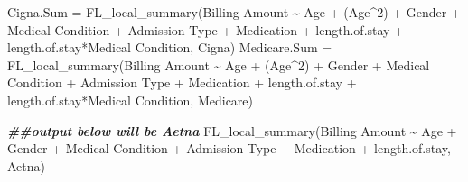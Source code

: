 \documentclass[
]{article}
\newenvironment{Shaded}{\begin{snugshade}}{\end{snugshade}}
\newcommand{\AttributeTok}[1]{\textcolor[rgb]{0.77,0.63,0.00}{#1}}
\newcommand{\DecValTok}[1]{\textcolor[rgb]{0.00,0.00,0.81}{#1}}
\newcommand{\DocumentationTok}[1]{\textcolor[rgb]{0.56,0.35,0.01}{\textbf{\textit{#1}}}}
\newcommand{\FunctionTok}[1]{\textcolor[rgb]{0.00,0.00,0.00}{#1}}
\newcommand{\NormalTok}[1]{#1}
\newcommand{\OtherTok}[1]{\textcolor[rgb]{0.56,0.35,0.01}{#1}}
\newcommand{\SpecialCharTok}[1]{\textcolor[rgb]{0.00,0.00,0.00}{#1}}
\newcommand{\StringTok}[1]{\textcolor[rgb]{0.31,0.60,0.02}{#1}}
\begin{document}
\begin{Shaded}
\begin{Highlighting}[]
\NormalTok{Cigna.Sum }\OtherTok{=} \FunctionTok{FL\_local\_summary}\NormalTok{(}\StringTok{\textasciigrave{}}\AttributeTok{Billing Amount}\StringTok{\textasciigrave{}} \SpecialCharTok{\textasciitilde{}}\NormalTok{ Age }\SpecialCharTok{+}\NormalTok{ (Age}\SpecialCharTok{\^{}}\DecValTok{2}\NormalTok{) }\SpecialCharTok{+}\NormalTok{ Gender }\SpecialCharTok{+} \StringTok{\textasciigrave{}}\AttributeTok{Medical Condition}\StringTok{\textasciigrave{}} \SpecialCharTok{+} \StringTok{\textasciigrave{}}\AttributeTok{Admission Type}\StringTok{\textasciigrave{}} \SpecialCharTok{+}\NormalTok{ Medication }\SpecialCharTok{+}\NormalTok{ length.of.stay }\SpecialCharTok{+}\NormalTok{ length.of.stay}\SpecialCharTok{*}\StringTok{\textasciigrave{}}\AttributeTok{Medical Condition}\StringTok{\textasciigrave{}}\NormalTok{, Cigna)}
\NormalTok{Medicare.Sum }\OtherTok{=} \FunctionTok{FL\_local\_summary}\NormalTok{(}\StringTok{\textasciigrave{}}\AttributeTok{Billing Amount}\StringTok{\textasciigrave{}} \SpecialCharTok{\textasciitilde{}}\NormalTok{ Age }\SpecialCharTok{+}\NormalTok{ (Age}\SpecialCharTok{\^{}}\DecValTok{2}\NormalTok{) }\SpecialCharTok{+}\NormalTok{ Gender }\SpecialCharTok{+} \StringTok{\textasciigrave{}}\AttributeTok{Medical Condition}\StringTok{\textasciigrave{}} \SpecialCharTok{+} \StringTok{\textasciigrave{}}\AttributeTok{Admission Type}\StringTok{\textasciigrave{}} \SpecialCharTok{+}\NormalTok{ Medication }\SpecialCharTok{+}\NormalTok{ length.of.stay }\SpecialCharTok{+}\NormalTok{ length.of.stay}\SpecialCharTok{*}\StringTok{\textasciigrave{}}\AttributeTok{Medical Condition}\StringTok{\textasciigrave{}}\NormalTok{, Medicare)}


\DocumentationTok{\#\#output below will be Aetna}
\FunctionTok{FL\_local\_summary}\NormalTok{(}\StringTok{\textasciigrave{}}\AttributeTok{Billing Amount}\StringTok{\textasciigrave{}} \SpecialCharTok{\textasciitilde{}}\NormalTok{ Age }\SpecialCharTok{+}\NormalTok{ Gender }\SpecialCharTok{+} \StringTok{\textasciigrave{}}\AttributeTok{Medical Condition}\StringTok{\textasciigrave{}} \SpecialCharTok{+} \StringTok{\textasciigrave{}}\AttributeTok{Admission Type}\StringTok{\textasciigrave{}} \SpecialCharTok{+}\NormalTok{ Medication }\SpecialCharTok{+}\NormalTok{ length.of.stay, Aetna)}
\end{Highlighting}
\end{Shaded}
\end{document}
